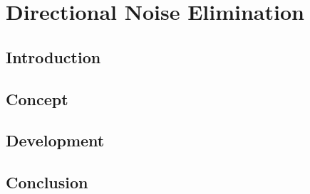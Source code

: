\chapter{Directional Noise Elimination}\label{DirectionalNoiseElimination}
\section{Introduction}
\section{Concept}
\section{Development}
\section{Conclusion}

